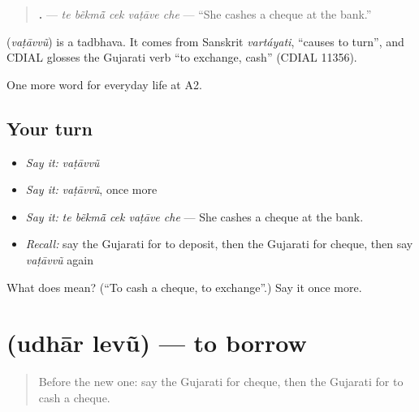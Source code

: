 \begin{quote}
\textbf{    .} — \emph{te bẽkmā̃ cek vaṭāve che} — \textquotedblleft{}She cashes a cheque at the bank.\textquotedblright{}
\end{quote}

\begin{cousinweb}
\textbf{} (\emph{vaṭāvvũ}) is a tadbhava. It comes from Sanskrit \emph{vartáyati}, \textquotedblleft{}causes to turn\textquotedblright{}, and CDIAL glosses the Gujarati verb \textquotedblleft{}to exchange, cash\textquotedblright{} (CDIAL 11356).
\end{cousinweb}

\begin{grammarlens}[title={What you've built}]
One more word for everyday life at A2.
\end{grammarlens}

\subsection*{Your turn}
\begin{itemize}
\raggedright
  \item \emph{Say it:} \emph{vaṭāvvũ}
  \item \emph{Say it:} \emph{vaṭāvvũ}, once more
  \item \emph{Say it:} \emph{te bẽkmā̃ cek vaṭāve che} — She cashes a cheque at the bank.
  \item \emph{Recall:} say the Gujarati for to deposit, then the Gujarati for cheque, then say \emph{vaṭāvvũ} again
\end{itemize}

\begin{tcolorbox}[breakable,colback=teal!4,colframe=teal!35!black,title={Before you move on}]
What does  mean? (\textquotedblleft{}To cash a cheque, to exchange\textquotedblright{}.) Say it once more.
\end{tcolorbox}
\section[\texorpdfstring{\gu{ઉધાર} \gu{લેવું} (udhār levũ)}{ઉધાર લેવું (udhār levũ)}]{  (udhār levũ) — to borrow}

\label{lesson:GU-C190-udhar-levu}



\begin{quote}
Before the new one: say the Gujarati for cheque, then the Gujarati for to cash a cheque.
\end{quote}

